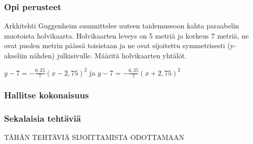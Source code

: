 \begin{tehtavasivu}

\subsubsection*{Opi perusteet}

\begin{tehtava}
Arkkitehti Guggenheim suunnittelee uuteen taidemuseoon kahta paraabelin muotoista holvikaarta. Holvikaarten leveys on 5 metriä ja korkeus 7 metriä, ne ovat puolen metrin päässä toisistaan ja ne ovat sijoitettu symmetrisesti (y-akseliin nähden) julkisivulle. Määritä holvikaarten yhtälöt.
\begin{vastaus}
$y-7 = -\frac{6,25}{7}(x - 2,75)^2$ ja $y-7 = -\frac{6,25}{7}(x + 2,75)^2$
\end{vastaus}
\end{tehtava}



\subsubsection*{Hallitse kokonaisuus}

\subsubsection*{Sekalaisia tehtäviä}

TÄHÄN TEHTÄVIÄ SIJOITTAMISTA ODOTTAMAAN

\end{tehtavasivu}